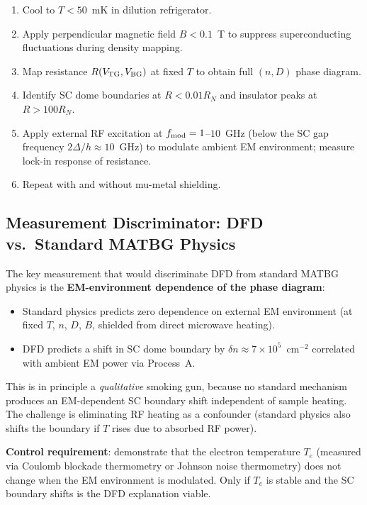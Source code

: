 \documentclass[11pt]{article}
\newcommand{\ee}[1]{\times 10^{#1}}
\begin{document}
\begin{enumerate}
  \item Cool to $T < 50$~mK in dilution refrigerator.
  \item Apply perpendicular magnetic field $B < 0.1$~T to suppress
    superconducting fluctuations during density mapping.
  \item Map resistance $R(V_{\rm TG}, V_{\rm BG})$ at fixed $T$ to obtain
    full $(n, D)$ phase diagram.
  \item Identify SC dome boundaries at $R < 0.01 R_N$ and insulator
    peaks at $R > 100 R_N$.
  \item Apply external RF excitation at $f_{\rm mod} = 1$--$10$~GHz
    (below the SC gap frequency $2\Delta/h \approx 10$~GHz) to modulate
    ambient EM environment; measure lock-in response of resistance.
  \item Repeat with and without mu-metal shielding.
\end{enumerate}

\subsection{Measurement Discriminator: DFD vs.\ Standard MATBG Physics}

The key measurement that would discriminate DFD from standard MATBG physics
is the \textbf{EM-environment dependence of the phase diagram}:
\begin{itemize}
  \item Standard physics predicts zero dependence on external EM environment
    (at fixed $T$, $n$, $D$, $B$, shielded from direct microwave heating).
  \item DFD predicts a shift in SC dome boundary by $\delta n \approx
    7\ee{5}$~cm$^{-2}$ correlated with ambient EM power via Process~A.
\end{itemize}
This is in principle a \emph{qualitative} smoking gun, because no standard
mechanism produces an EM-dependent SC boundary shift independent of sample
heating. The challenge is eliminating RF heating as a confounder (standard
physics also shifts the boundary if $T$ rises due to absorbed RF power).

\textbf{Control requirement}: demonstrate that the electron temperature
$T_e$ (measured via Coulomb blockade thermometry or Johnson noise
thermometry) does not change when the EM environment is modulated.
Only if $T_e$ is stable and the SC boundary shifts is the DFD explanation
viable.

\end{document}
